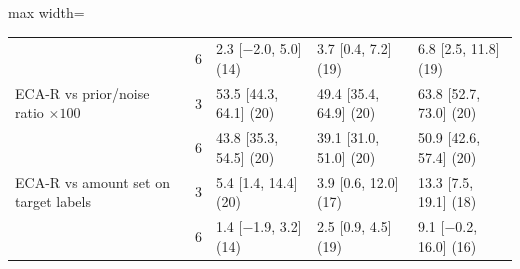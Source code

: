\begin{table}[H]
\begin{adjustbox}{max width=\linewidth}
\begin{tabular}{@{}lrlll@{}}
\quad  & 6 & 2.3 [$-$2.0, 5.0] (14) & 3.7 [0.4, 7.2] (19) & 6.8 [2.5, 11.8] (19) \\
\quad ECA-R vs prior/noise ratio $\times 100$ & 3 & 53.5 [44.3, 64.1] (20) & 49.4 [35.4, 64.9] (20) & 63.8 [52.7, 73.0] (20) \\
\quad  & 6 & 43.8 [35.3, 54.5] (20) & 39.1 [31.0, 51.0] (20) & 50.9 [42.6, 57.4] (20) \\
\quad ECA-R vs amount set on target labels & 3 & 5.4 [1.4, 14.4] (20) & 3.9 [0.6, 12.0] (17) & 13.3 [7.5, 19.1] (18) \\
\quad  & 6 & 1.4 [$-$1.9, 3.2] (14) & 2.5 [0.9, 4.5] (19) & 9.1 [$-$0.2, 16.0] (16) \\
\bottomrule
\end{tabular}
\end{adjustbox}
\end{table}
